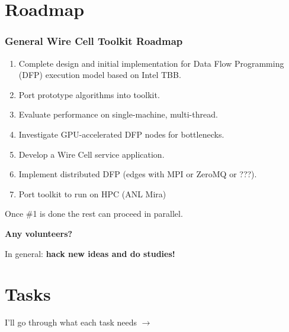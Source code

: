 \documentclass[xcolor=dvipsnames]{beamer}
\begin{document}




\section{Roadmap}

\begin{frame}
  \frametitle{General Wire Cell Toolkit Roadmap}

  \begin{enumerate}\small
  \item Complete design and initial implementation for Data Flow
    Programming (DFP) execution model based on Intel TBB.
  \item Port prototype algorithms into toolkit.
  \item Evaluate performance on single-machine, multi-thread.
  \item Investigate GPU-accelerated DFP nodes for bottlenecks.
  \item Develop a Wire Cell service application.
  \item Implement distributed DFP (edges with MPI or ZeroMQ or ???).
  \item Port toolkit to run on HPC (ANL Mira)
  \end{enumerate}

  Once \#1 is done the rest can proceed in parallel.

  \textbf{Any volunteers?}

  \begin{center}
      In general:   \textbf{hack new ideas and do studies!}
  \end{center}


\end{frame}

\section{Tasks}

\begin{frame}
  I'll go through what each task needs $\longrightarrow$
\end{frame}
\end{document}
